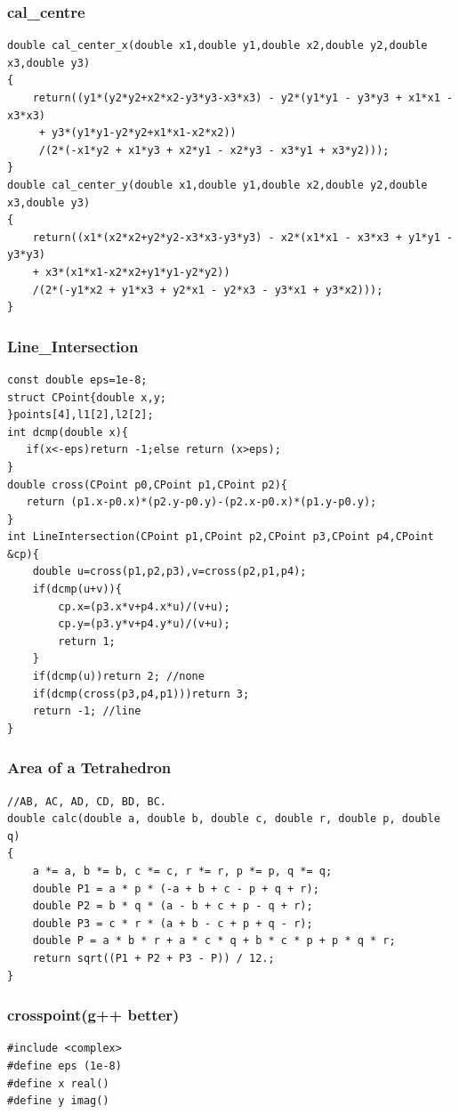\documentclass[a4paper]{article}
\begin{document}
\begin{CJK*}{UTF8}{gbsn}
\begin{multicols}{3}
\begin{flushleft}
\subsubsection{cal\_centre}
\begin{lstlisting}
double cal_center_x(double x1,double y1,double x2,double y2,double x3,double y3)
{
    return((y1*(y2*y2+x2*x2-y3*y3-x3*x3) - y2*(y1*y1 - y3*y3 + x1*x1 - x3*x3)
     + y3*(y1*y1-y2*y2+x1*x1-x2*x2))
     /(2*(-x1*y2 + x1*y3 + x2*y1 - x2*y3 - x3*y1 + x3*y2)));
}
double cal_center_y(double x1,double y1,double x2,double y2,double x3,double y3)
{
    return((x1*(x2*x2+y2*y2-x3*x3-y3*y3) - x2*(x1*x1 - x3*x3 + y1*y1 - y3*y3)
    + x3*(x1*x1-x2*x2+y1*y1-y2*y2))
    /(2*(-y1*x2 + y1*x3 + y2*x1 - y2*x3 - y3*x1 + y3*x2)));
}
\end{lstlisting}

\subsubsection{Line\_Intersection}
\begin{lstlisting}
const double eps=1e-8;
struct CPoint{double x,y;
}points[4],l1[2],l2[2];
int dcmp(double x){
   if(x<-eps)return -1;else return (x>eps);
}
double cross(CPoint p0,CPoint p1,CPoint p2){
   return (p1.x-p0.x)*(p2.y-p0.y)-(p2.x-p0.x)*(p1.y-p0.y);
}
int LineIntersection(CPoint p1,CPoint p2,CPoint p3,CPoint p4,CPoint &cp){
    double u=cross(p1,p2,p3),v=cross(p2,p1,p4);
    if(dcmp(u+v)){
        cp.x=(p3.x*v+p4.x*u)/(v+u);
        cp.y=(p3.y*v+p4.y*u)/(v+u);
        return 1;
    }
    if(dcmp(u))return 2; //none
    if(dcmp(cross(p3,p4,p1)))return 3;
    return -1; //line
}
\end{lstlisting}



\subsubsection{Area of a Tetrahedron}
\begin{lstlisting}
//AB, AC, AD, CD, BD, BC.
double calc(double a, double b, double c, double r, double p, double q)
{
    a *= a, b *= b, c *= c, r *= r, p *= p, q *= q;
    double P1 = a * p * (-a + b + c - p + q + r);
    double P2 = b * q * (a - b + c + p - q + r);
    double P3 = c * r * (a + b - c + p + q - r);
    double P = a * b * r + a * c * q + b * c * p + p * q * r;
    return sqrt((P1 + P2 + P3 - P)) / 12.;
}
\end{lstlisting}


\subsubsection{crosspoint(g++ better)}
\begin{lstlisting}
#include <complex>
#define eps (1e-8)
#define x real()
#define y imag()


\end{lstlisting}
\end{flushleft}
\end{multicols}
\end{CJK*}
\end{document}
